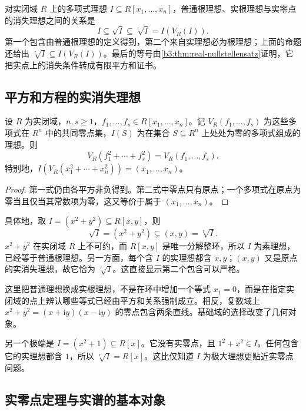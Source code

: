 对实闭域 \(R\) 上的多项式理想 \(I\subseteq R[x_1,\ldots,x_n]\)，普通根理想、实根理想与实零点的消失理想之间的关系是
\[
	I\subseteq\sqrt I\subseteq\sqrt[\mathrm r]{I}=I(V_R(I)).
\]
第一个包含由普通根理想的定义得到，第二个来自实理想必为根理想；上面的命题还给出 \(\sqrt[\mathrm r]{I}\subseteq I(V_R(I))\)。最后的等号由\cref{b3:thm:real-nullstellensatz}证明，它把实点上的消失条件转成有限平方和证书。

\subsection{平方和方程的实消失理想}
\label{b3:subsec:G02:02}

\begin{proposition}\label{b3:prop:sum-square-real-zero}
	设 \(R\) 为实闭域，\(n,s\ge1\)，\(f_1,\ldots,f_s\in R[x_1,\ldots,x_n]\)。记 \(V_R(f_1,\ldots,f_s)\) 为这些多项式在 \(R^n\) 中的共同零点集，\(I(S)\) 为在集合 \(S\subseteq R^n\) 上处处为零的多项式组成的理想。则
	\[
		V_R(f_1^2+\cdots+f_s^2)=V_R(f_1,\ldots,f_s).
	\]
	特别地，\(I(V_R(x_1^2+\cdots+x_n^2))=(x_1,\ldots,x_n)\)。
\end{proposition}
\begin{proof}
	第一式仍由各平方非负得到。第二式中零点只有原点；一个多项式在原点为零当且仅当其常数项为零，这又等价于属于 \((x_1,\ldots,x_n)\)。
\end{proof}

具体地，取 \(I=(x^2+y^2)\subseteq R[x,y]\)，则
\[
	\sqrt I=(x^2+y^2)\subsetneq(x,y)=\sqrt[\mathrm r]{I}.
\]
\(x^2+y^2\) 在实闭域 \(R\) 上不可约，而 \(R[x,y]\) 是唯一分解整环，所以 \(I\) 为素理想，已经等于普通根理想。另一方面，每个含 \(I\) 的实理想都含 \(x,y\)；\((x,y)\) 又是原点的实消失理想，故它恰为 \(\sqrt[\mathrm r]{I}\)。这直接显示第二个包含可以严格。

\ProseParagraphBreak
这里把普通理想换成实根理想，不是在环中增加一个等式 \(x_1=0\)，而是在指定实闭域的点上辨认哪些等式已经由平方和关系强制成立。相反，复数域上 \(x^2+y^2=(x+\mathrm iy)(x-\mathrm iy)\) 的零点包含两条直线。基础域的选择改变了几何对象。

\ProseParagraphBreak
另一个极端是 \(I=(x^2+1)\subseteq R[x]\)。它没有实零点，且 \(1^2+x^2\in I\)。任何包含它的实理想都含 \(1\)，所以 \(\sqrt[\mathrm r]{I}=R[x]\)。这比仅知道 \(I\) 为极大理想更贴近实零点问题。

\subsection{实零点定理与实谱的基本对象}
\label{b3:subsec:G02:03}

